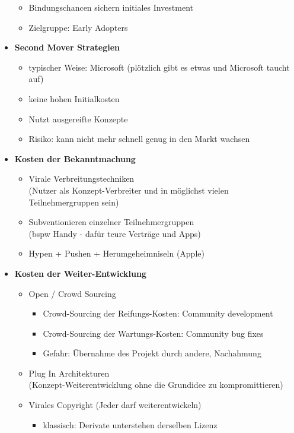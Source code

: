 \documentclass{article} %
\begin{document}
\begin{itemize}
\begin{itemize}
					\item Bindungschancen sichern initiales Investment 
					\item Zielgruppe: Early Adopters
				\end{itemize}
			\item \textbf{Second Mover Strategien}
				\begin{itemize}
					\item typischer Weise: Microsoft (plötzlich gibt es etwas und Microsoft taucht auf)
					\item keine hohen Initialkosten
					\item Nutzt ausgereifte Konzepte
					\item Risiko: kann nicht mehr schnell genug in den Markt wachsen
				\end{itemize}
			\item \textbf{Kosten der Bekanntmachung}
			\begin{itemize}
				\item Virale Verbreitungstechniken\\
				(Nutzer als Konzept-Verbreiter und in möglichst vielen Teilnehmergruppen sein)
				\item Subventionieren einzelner Teilnehmergruppen\\
				(bspw Handy - dafür teure Verträge und Apps)
				\item Hypen + Pushen + Herumgeheimniseln (Apple)
			\end{itemize}
			\item \textbf{Kosten der Weiter-Entwicklung}
			\begin{itemize}
				\item Open / Crowd Sourcing
				\begin{itemize}
					\item Crowd-Sourcing der Reifungs-Kosten: Community development
					\item Crowd-Sourcing der Wartungs-Kosten: Community bug fixes
					\item Gefahr: Übernahme des Projekt durch andere, Nachahmung
				\end{itemize}
				\item Plug In Architekturen\\
				(Konzept-Weiterentwicklung ohne die Grundidee zu kompromittieren)
				\item Virales Copyright (Jeder darf weiterentwickeln)
				\begin{itemize}
					\item klassisch: Derivate unterstehen derselben Lizenz

\end{itemize}
\end{itemize}
\end{itemize}
\end{document}
